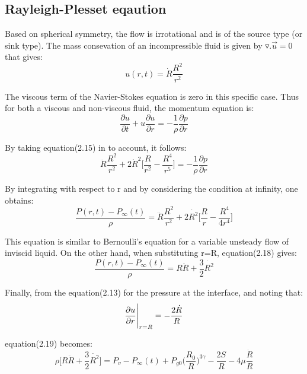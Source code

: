 \subsection{Rayleigh-Plesset eqaution}
Based on spherical symmetry, the flow is irrotational and is of the
source type (or sink type). The mass consevation of an incompressible
fluid is given by $\triangledown.{\vec{u}}=0$ that gives:
\begin{equation}
u(r,t)=\dot{R}\frac{{R}^2}{{r}^2}
\end{equation}

The viscous term of the Navier-Stokes equation is zero in this
specific case. Thus for both a viscous and non-viscous fluid, the
momentum equation is:
\begin{equation}
{\frac{\partial u}{\partial t}}+u{\frac{\partial u}{\partial r}}=-{\frac{1}{\rho}}{\frac{\partial p}{\partial r}}
\end{equation}

By taking equation(2.15) in to account, it follows:
\begin{equation}
{\ddot{R}}{\frac{{R}^2}{r^2}}+2{{\dot{R}}^2}\Bigg[{\frac{R}{r^2}}-{\frac{R^4}{r^5}}\Bigg]=-{\frac{1}{\rho}}{\frac{\partial{p}}{\partial{r}}}
\end{equation}

By integrating with respect to r and by considering the condition at
infinity, one  obtains:
\begin{equation}
{\frac{P(r,t)-{P_{\infty}}(t)}{\rho}}={\ddot{R}}{\frac{{R}^2}{r^2}}+2{\dot{R^2}}{\Bigg[{\frac{R}{r}}-{\frac{R^4}{4r^4}}\Bigg]}
\end{equation}

This equation is similar to Bernoulli's equation for a variable
unsteady flow of inviscid liquid. On the other hand, when substituting
r=R, equation(2.18) gives:
\begin{equation}
{\frac{P(r,t)-{P_{\infty}}(t)}{\rho}}=R{\ddot{R}}+{\frac{3}{2}}{\dot{R^2}}
\end{equation}

Finally, from the equation(2.13) for the pressure at the interface,
and noting that:
\begin{equation}
{{\frac{\partial u}{\partial r}}\Bigg{\vert}_{r=R}}=-{\frac{2\dot R}{R}}
\end{equation}

equation(2.19) becomes:
\begin{equation}
 {\rho \Bigg[{R{\ddot{R}} + {\frac{3}{2}}{\dot{R^2}}}\Bigg]} = {P_v} -
 {{P_{\infty}}(t)}+{P_{g0}}{\Bigg({\frac{R_0}{R}\Bigg)^{3\gamma}}} -
 {\frac{2S}{R}} - 4\mu{\frac{\dot R}{R}}
\end{equation}


